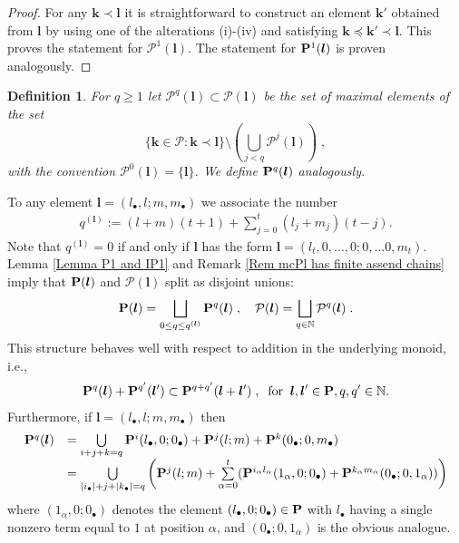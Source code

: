 \documentclass[12pt]{article}
\def\NN {{\mathbb N}}     %
\def\mc {\mathcal}
\newtheorem{definition}{Definition}[section]
\begin{document}
\begin{proof}
For any $\bm k\prec\bm l$ it is straightforward to construct an element $\bm k'$ obtained from $\bm l$ by using one of the alterations (i)-(iv) and satisfying $\bm k\preceq\bm k'\prec\bm l$. This proves the statement for $\mc P^1(\bm l)$. The statement for ${\bf P}^1(\bm l)$ is proven analogously.
\end{proof}

\begin{definition}\label{Def Pqp}
For $q\geq 1$ let $\mc P^q(\bm l)\subset\mc P(\bm l)$ be the set of maximal elements of the set 
$$
\{\bm k\in\mc P:\bm k\prec\bm l\}\setminus \left(\bigcup\limits_{j< q} \mc P^{j}(\bm l)\right) \;,
$$
with the convention $\mc P^0(\bm l)=\{\bm l\}$. We define ${\bf P}^q(\bm l)$ analogously.
\end{definition}

To any element $\bm l= (l_\bullet,l;m,m_\bullet)$ we associate the number
\begin{gather}\label{For qlm}
q^{(\bm l)}:=(l+m)(t+1)+\sum\limits_{j=0}^{t} (l_j+m_j)(t-j) . 
\end{gather}
Note that $q^{(\bm l)}=0$ if and only if $\bm l$ has the form $\bm l=(l_{t},0,...,0;0,...0,m_t)$. Lemma \ref{Lemma P1 and IP1} and Remark \ref{Rem mcPl has finite assend chains} imply that ${\bf P}(\bm l)$ and $\mc P(\bm l)$ split as disjoint unions: 
\begin{gather}\label{For bfPl and mcPl disjU}
{\bf P}(\bm l)=\bigsqcup\limits_{0\leq q\leq q^{(\bm l)}}{\bf P}^q(\bm l) \;,\quad {\mc P}(\bm l)=\bigsqcup\limits_{q\in\NN}{\mc P}^q(\bm l)\;.
\end{gather}
This structure behaves well with respect to addition in the underlying monoid, i.e.,
\begin{gather}\label{For Pq additive}
{\bf P}^{q}(\bm l)+{\bf P}^{q'}(\bm l') \subset {\bf P}^{q+q'}(\bm l+\bm l')\;,\;\; {\rm for}\;\;\bm l,\bm l'\in{\bf P}, q,q'\in\NN.
\end{gather}
Furthermore, if $\bm l=(l_\bullet,l;m,m_\bullet)$ then
\begin{gather}\label{For Pql compute}
\begin{array}{rl}
{\bf P}^{q}(\bm l) & = \bigcup\limits_{i+j+k=q} {\bf P}^{i}(l_\bullet,0;0_\bullet)+ {\bf P}^{j}(l;m) + {\bf P}^{k}(0_\bullet;0,m_\bullet) \\
& =\bigcup\limits_{|i_\bullet|+j+|k_\bullet|=q} \left( {\bf P}^{j}(l;m) + \sum\limits_{\alpha=0}^t ({\bf P}^{i_\alpha l_\alpha}(1_\alpha,0;0_\bullet)+ {\bf P}^{k_\alpha m_\alpha}(0_\bullet;0,1_\alpha)) \right)
\end{array}
\end{gather}
where $(1_\alpha,0;0_\bullet)$ denotes the element $(l_\bullet,0;0_\bullet)\in{\bf P}$ with $l_\bullet$ having a single nonzero term equal to $1$ at position $\alpha$, and $(0_\bullet;0,1_\alpha)$ is the obvious analogue. 
\end{document}
